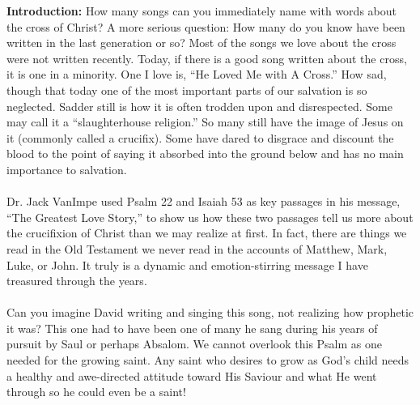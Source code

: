 \textbf{Introduction: } How many songs can you immediately name with words about the cross of Christ? A more serious question: How many do you know have been written in the last generation or so? Most of the songs we love about the cross were not written recently. Today, if there is a good song written about the cross, it is one in a minority. One I love is, “He Loved Me with A Cross.” How sad, though that today one of the most important parts of our salvation is so neglected. Sadder still is how it is often trodden upon and disrespected. Some may call it a “slaughterhouse religion.” So many still have the image of Jesus on it (commonly called a crucifix). Some have dared to disgrace and discount the blood to the point of saying it absorbed into the ground below and has no main importance to salvation.\\
\\
Dr. Jack VanImpe used Psalm 22 and Isaiah 53 as key passages in his message, “The Greatest Love Story,” to show us how these two passages tell us more about the crucifixion of Christ than we may realize at first. In fact, there are things we read in the Old Testament we never read in the accounts of Matthew, Mark, Luke, or John. It truly is a dynamic and emotion-stirring message I have treasured through the years.\\
\\
Can you imagine David writing and singing this song, not realizing how prophetic it was? This one had to have been one of many he sang during his years of pursuit by Saul or perhaps Absalom. We cannot overlook this Psalm as one needed for the growing saint. Any saint who desires to grow as God’s child needs a healthy and awe-directed attitude toward His Saviour and what He went through so he could even be a saint!

